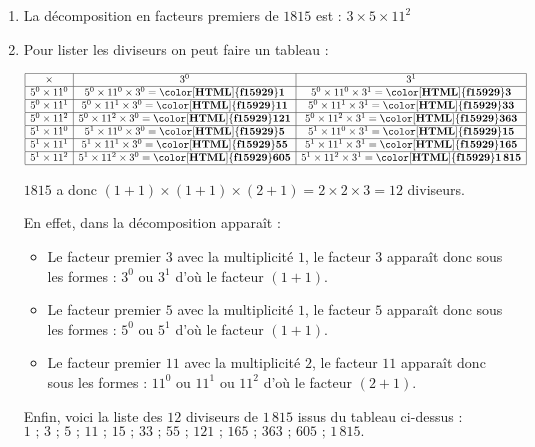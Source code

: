 
    \begin{enumerate}
        \item La décomposition en facteurs premiers de $\num{1815}$ est : $3\times 5\times 11^{2}$
        \item Pour lister les diviseurs on peut faire un tableau :

        \smallskip
        $
        \begin{array}{|c|c|c|}
        \hline
        \times & 3^{0} & 3^{1}\\
        \hline
        5^{0}\times11^{0} & 5^{0}\times11^{0}\times3^{0}=\mathbf{{\color[HTML]{f15929}1}} & 5^{0}\times11^{0}\times3^{1}=\mathbf{{\color[HTML]{f15929}3}}\\
        \hline
        5^{0}\times11^{1} & 5^{0}\times11^{1}\times3^{0}=\mathbf{{\color[HTML]{f15929}11}} & 5^{0}\times11^{1}\times3^{1}=\mathbf{{\color[HTML]{f15929}33}}\\
        \hline
        5^{0}\times11^{2} & 5^{0}\times11^{2}\times3^{0}=\mathbf{{\color[HTML]{f15929}121}} & 5^{0}\times11^{2}\times3^{1}=\mathbf{{\color[HTML]{f15929}363}}\\
        \hline
        5^{1}\times11^{0} & 5^{1}\times11^{0}\times3^{0}=\mathbf{{\color[HTML]{f15929}5}} & 5^{1}\times11^{0}\times3^{1}=\mathbf{{\color[HTML]{f15929}15}}\\
        \hline
        5^{1}\times11^{1} & 5^{1}\times11^{1}\times3^{0}=\mathbf{{\color[HTML]{f15929}55}} & 5^{1}\times11^{1}\times3^{1}=\mathbf{{\color[HTML]{f15929}165}}\\
        \hline
        5^{1}\times11^{2} & 5^{1}\times11^{2}\times3^{0}=\mathbf{{\color[HTML]{f15929}605}} & 5^{1}\times11^{2}\times3^{1}=\mathbf{{\color[HTML]{f15929}1\,815}}\\
        \hline
        \end{array}
        $
        \smallskip

        $\num{1815}$ a donc $(1+1)\times(1+1)\times(2+1) = 2\times2\times3 = 12$ diviseurs.

        En effet, dans la décomposition apparaît :
        \begin{itemize}
            \item Le facteur premier $3$ avec la multiplicité $1$, le facteur $3$ apparaît donc sous les formes : $3^{0}$ ou $3^{1}$ d'où le facteur $(1+1)$.
            \item Le facteur premier $5$ avec la multiplicité $1$, le facteur $5$ apparaît donc sous les formes : $5^{0}$ ou $5^{1}$ d'où le facteur $(1+1)$.
            \item Le facteur premier $11$ avec la multiplicité $2$, le facteur $11$ apparaît donc sous les formes : $11^{0}$ ou $11^{1}$ ou $11^{2}$ d'où le facteur $(2+1)$.
        \end{itemize}

        Enfin, voici la liste des $12$ diviseurs de $1\,815$ issus du tableau ci-dessus : $1\text{ ; }3\text{ ; }5\text{ ; }11\text{ ; }15\text{ ; }33\text{ ; }55\text{ ; }121\text{ ; }165\text{ ; }363\text{ ; }605\text{ ; }1\,815.$
    \end{enumerate}

